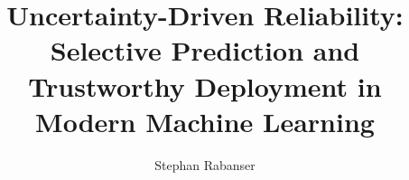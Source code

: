 \documentclass[dvipsnames]{ut-thesis}
\author{Stephan Rabanser}
\title{Uncertainty-Driven Reliability: Selective Prediction and Trustworthy Deployment in Modern Machine Learning}
\begin{document}
  \frontmatter
    \maketitle
    \begin{abstract}
      
    \end{abstract}
    \begin{acknowledgements}
      
    \end{acknowledgements}
    \tableofcontents
    \listoftables
    \listoffigures
  \mainmatter
    
    
    
    
    
    
    
  \appendix
    
    
    
    
  \backmatter
  

  
\end{document}
